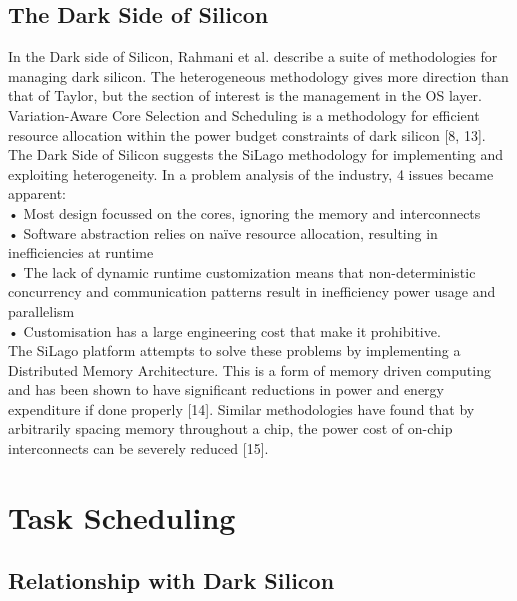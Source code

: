 		\subsection{The Dark Side of Silicon}
			In the Dark side of Silicon, Rahmani et al. describe a suite of methodologies for managing dark silicon. The heterogeneous methodology gives more direction than that of Taylor, but the section of interest is the management in the OS layer. Variation-Aware Core Selection and Scheduling is a methodology for efficient resource allocation within the power budget constraints of dark silicon [8, 13].
			The Dark Side of Silicon suggests the SiLago methodology for implementing and exploiting heterogeneity. In a problem analysis of the industry, 4 issues became apparent:\\
			• Most design focussed on the cores, ignoring the memory and interconnects\\
			• Software abstraction relies on naïve resource allocation, resulting in inefficiencies at runtime\\
			• The lack of dynamic runtime customization means that non-deterministic concurrency and communication patterns result in inefficiency power usage and parallelism\\
			•  Customisation has a large engineering cost that make it prohibitive.\\
			The SiLago platform attempts to solve these problems by implementing a Distributed Memory Architecture. This is a form of memory driven computing and has been shown to have significant reductions in power and energy expenditure if done properly [14]. Similar methodologies have found that by arbitrarily spacing memory throughout a chip, the power cost of on-chip interconnects can be severely reduced [15].
	
	\section{Task Scheduling}
	
		\subsection{Relationship with Dark Silicon}
		
